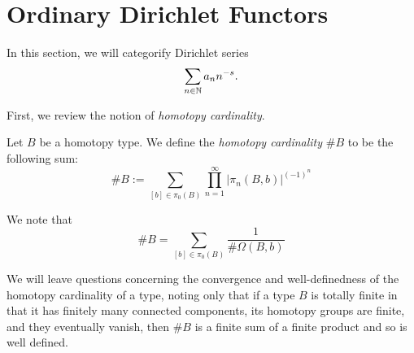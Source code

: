 \section{Ordinary Dirichlet Functors} \label{sec:ordinary.dirichlet.functors}

In this section, we will categorify Dirichlet series
$$\sum_{n \in \operatorname{\mathbb{N}}} a_n n^{-s}.$$

First, we review the notion of \emph{homotopy cardinality}.

\begin{defn}
Let $B$ be a homotopy type. We define the \emph{homotopy cardinality} $\#B$ to be
the following sum:
$$\#B := \sum_{[b] \in \pi_0(B)} \prod_{n = 1}^{\infty} |\pi_n(B, b)|^{(-1)^n}$$

We note that
$$\#B = \sum_{[b] \in \pi_0(B)} \frac{1}{\#\Omega(B, b)}$$
\end{defn}

We will leave questions concerning the convergence and well-definedness of the
homotopy cardinality of a type, noting only that if a type $B$ is totally finite in
that it has finitely many connected components, its homotopy groups are finite,
and they eventually vanish, then $\#B$ is a finite sum of a finite product and so
is well defined.

